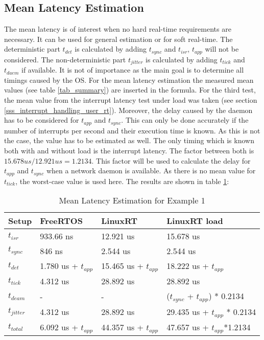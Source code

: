 \subsection{Mean Latency Estimation}\label{sss_mean_latency_estimation}
The mean latency is of interest when no hard real-time requirements are necessary. 
It can be used for general estimation or for soft real-time.
The deterministic part $t_{det}$ is calculated by adding $t_{sync}$ and $t_{isr}$, $t_{app}$ will not be considered. 
The non-deterministic part $t_{jitter}$ is calculated by adding $t_{tick}$ and $t_{daem}$ if available.
It is not of importance as the main goal is to determine all timings caused by the \ac{OS}.
For the mean latency estimation the measured mean values (see table \ref{tab_summary}) are inserted in the formula.
For the third test, the mean value from the interrupt latency test under load was taken (see section \ref{sss_interrupt_handling_user_rt}).
Moreover, the delay caused by the daemon has to be considered for $t_{app}$ and $t_{sync}$.
This can only be done accurately if the number of interrupts per second and their execution time is known.
As this is not the case, the value has to be estimated as well.
The only timing which is known both with and without load is the interrupt latency.
The factor between both is $15.678 us / 12.921 us = 1.2134 $.   
This factor will be used to calculate the delay for $t_{app}$ and $t_{sync}$ when a network daemon is available.
As there is no mean value for $t_{tick}$, the worst-case value is used here. 
The results are shown in table \ref{tab_example1_mean}:
\begin{table}[htbp]
	\centering
		\begin{tabular}{|l|l|l|l|}
			\hline
				Setup					& FreeRTOS 								& LinuxRT 							& LinuxRT load  \\
				\hline 
				$t_{isr}$ 		& 933.66 ns 							& 12.921 us 						& 15.678 us			\\
			  $t_{sync}$		& 846 ns	  							& 2.544 us 				 			& 2.544 us			\\
			  \hline 
			  $t_{det}$			& 1.780 us + $t_{app}$		& 15.465 us + $t_{app}$	& 18.222 us	+ $t_{app}$		\\ 
			  \hline
			  \hline
			  $t_{tick}$		& 4.312 us								& 28.892 us 					  & 28.892 us											\\
			  $t_{deam}$		& -				  							& - 				 						& ($t_{sync}$ + $t_{app}$) * 0.2134 \\ 
				\hline 
			  $t_{jitter}$	& 4.312 us  							& 28.892 us						  & 29.435 us	+ $t_{app}$ * 0.2134	\\ 
			  \hline
			  \hline 
			  $t_{total}$		& 6.092 us + $t_{app}$	 & 44.357 us + $t_{app}$  &	47.657 us + $t_{app}$*1.2134 	\\ 
			\hline
		\end{tabular}
	\caption{Mean Latency Estimation for Example 1}
	\label{tab_example1_mean}
\end{table}

